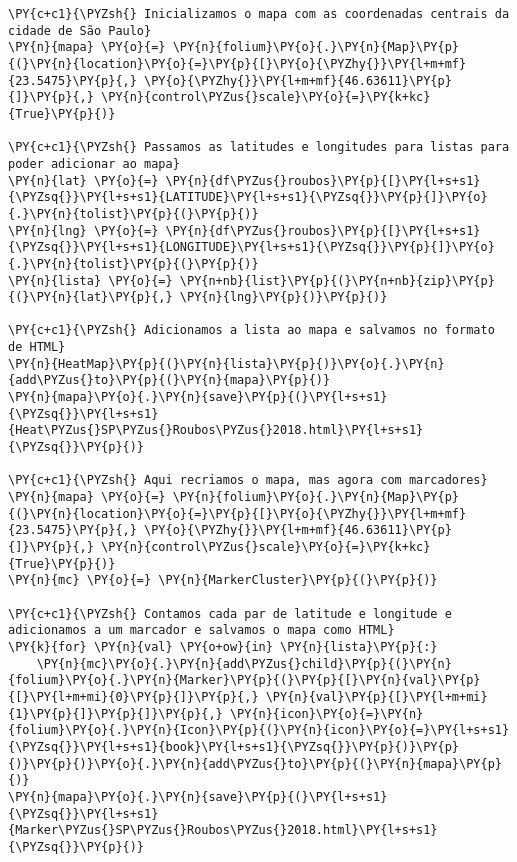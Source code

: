     \begin{tcolorbox}[breakable, size=fbox, boxrule=1pt, pad at break*=1mm,colback=cellbackground, colframe=cellborder]
\begin{Verbatim}[commandchars=\\\{\}]
\PY{c+c1}{\PYZsh{} Inicializamos o mapa com as coordenadas centrais da cidade de São Paulo}
\PY{n}{mapa} \PY{o}{=} \PY{n}{folium}\PY{o}{.}\PY{n}{Map}\PY{p}{(}\PY{n}{location}\PY{o}{=}\PY{p}{[}\PY{o}{\PYZhy{}}\PY{l+m+mf}{23.5475}\PY{p}{,} \PY{o}{\PYZhy{}}\PY{l+m+mf}{46.63611}\PY{p}{]}\PY{p}{,} \PY{n}{control\PYZus{}scale}\PY{o}{=}\PY{k+kc}{True}\PY{p}{)}

\PY{c+c1}{\PYZsh{} Passamos as latitudes e longitudes para listas para poder adicionar ao mapa}
\PY{n}{lat} \PY{o}{=} \PY{n}{df\PYZus{}roubos}\PY{p}{[}\PY{l+s+s1}{\PYZsq{}}\PY{l+s+s1}{LATITUDE}\PY{l+s+s1}{\PYZsq{}}\PY{p}{]}\PY{o}{.}\PY{n}{tolist}\PY{p}{(}\PY{p}{)}
\PY{n}{lng} \PY{o}{=} \PY{n}{df\PYZus{}roubos}\PY{p}{[}\PY{l+s+s1}{\PYZsq{}}\PY{l+s+s1}{LONGITUDE}\PY{l+s+s1}{\PYZsq{}}\PY{p}{]}\PY{o}{.}\PY{n}{tolist}\PY{p}{(}\PY{p}{)}
\PY{n}{lista} \PY{o}{=} \PY{n+nb}{list}\PY{p}{(}\PY{n+nb}{zip}\PY{p}{(}\PY{n}{lat}\PY{p}{,} \PY{n}{lng}\PY{p}{)}\PY{p}{)}

\PY{c+c1}{\PYZsh{} Adicionamos a lista ao mapa e salvamos no formato de HTML}
\PY{n}{HeatMap}\PY{p}{(}\PY{n}{lista}\PY{p}{)}\PY{o}{.}\PY{n}{add\PYZus{}to}\PY{p}{(}\PY{n}{mapa}\PY{p}{)}
\PY{n}{mapa}\PY{o}{.}\PY{n}{save}\PY{p}{(}\PY{l+s+s1}{\PYZsq{}}\PY{l+s+s1}{Heat\PYZus{}SP\PYZus{}Roubos\PYZus{}2018.html}\PY{l+s+s1}{\PYZsq{}}\PY{p}{)}

\PY{c+c1}{\PYZsh{} Aqui recriamos o mapa, mas agora com marcadores}
\PY{n}{mapa} \PY{o}{=} \PY{n}{folium}\PY{o}{.}\PY{n}{Map}\PY{p}{(}\PY{n}{location}\PY{o}{=}\PY{p}{[}\PY{o}{\PYZhy{}}\PY{l+m+mf}{23.5475}\PY{p}{,} \PY{o}{\PYZhy{}}\PY{l+m+mf}{46.63611}\PY{p}{]}\PY{p}{,} \PY{n}{control\PYZus{}scale}\PY{o}{=}\PY{k+kc}{True}\PY{p}{)}
\PY{n}{mc} \PY{o}{=} \PY{n}{MarkerCluster}\PY{p}{(}\PY{p}{)}

\PY{c+c1}{\PYZsh{} Contamos cada par de latitude e longitude e adicionamos a um marcador e salvamos o mapa como HTML}
\PY{k}{for} \PY{n}{val} \PY{o+ow}{in} \PY{n}{lista}\PY{p}{:}
    \PY{n}{mc}\PY{o}{.}\PY{n}{add\PYZus{}child}\PY{p}{(}\PY{n}{folium}\PY{o}{.}\PY{n}{Marker}\PY{p}{(}\PY{p}{[}\PY{n}{val}\PY{p}{[}\PY{l+m+mi}{0}\PY{p}{]}\PY{p}{,} \PY{n}{val}\PY{p}{[}\PY{l+m+mi}{1}\PY{p}{]}\PY{p}{]}\PY{p}{,} \PY{n}{icon}\PY{o}{=}\PY{n}{folium}\PY{o}{.}\PY{n}{Icon}\PY{p}{(}\PY{n}{icon}\PY{o}{=}\PY{l+s+s1}{\PYZsq{}}\PY{l+s+s1}{book}\PY{l+s+s1}{\PYZsq{}}\PY{p}{)}\PY{p}{)}\PY{p}{)}\PY{o}{.}\PY{n}{add\PYZus{}to}\PY{p}{(}\PY{n}{mapa}\PY{p}{)}
\PY{n}{mapa}\PY{o}{.}\PY{n}{save}\PY{p}{(}\PY{l+s+s1}{\PYZsq{}}\PY{l+s+s1}{Marker\PYZus{}SP\PYZus{}Roubos\PYZus{}2018.html}\PY{l+s+s1}{\PYZsq{}}\PY{p}{)}
\end{Verbatim}
\end{tcolorbox}